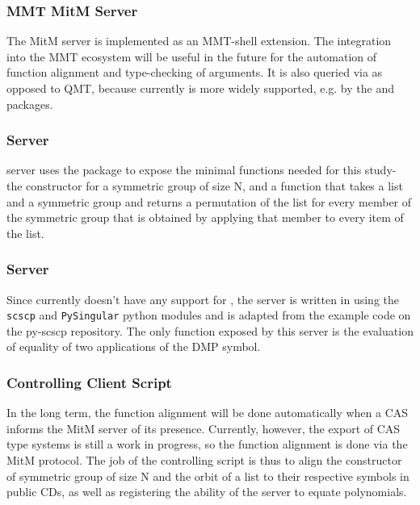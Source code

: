 \subsubsection{MMT MitM Server}
The MitM server is implemented as an MMT-shell extension. The integration into the
MMT ecosystem will be useful in the future for the automation of function 
alignment and type-checking of arguments. It is also queried via \SCSCP as opposed 
to QMT, because currently \SCSCP is more widely supported, e.g. by the \GAP and 
\Python packages.

\subsubsection{\GAP \SCSCP Server}
\GAP server uses the \GAP \SCSCP package to expose the minimal functions needed for 
this study- the constructor for a symmetric group of size N, and a function that
takes a list and a symmetric group and returns a permutation of the list for every 
member of the symmetric group that is obtained by applying that member to every
item of the list.

\subsubsection{\Singular \SCSCP Server}
Since \Singular currently doesn't have any support for \SCSCP, the \Singular \SCSCP server is
written in \Python using the \lstinline|scscp| and \lstinline|PySingular| python modules
and is adapted from the example code on the py-scscp repository\cite{PySCSCP}. The only
function exposed by this server is the evaluation of equality of two applications of the
DMP symbol.

\subsubsection{Controlling Client Script}
In the long term, the function alignment will be done automatically when a CAS 
informs the MitM server of its presence. Currently, however, the export of CAS 
type systems is still a work in progress, so the function alignment is done
via the MitM protocol. The job of the controlling script is thus to align the 
constructor of symmetric group of size N and the orbit of a list to their 
respective symbols in public CDs, as well as registering the ability of the 
\Singular server to equate polynomials.

